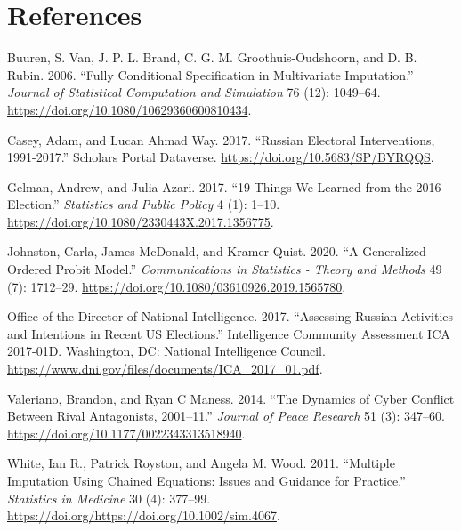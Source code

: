 \documentclass[
]{article}
\begin{document}
\hypertarget{references}{%
\section*{References}\label{references}}

\hypertarget{refs}{}
\leavevmode\hypertarget{ref-buuren_fullyconditionalspecification_2006}{}%
Buuren, S. Van, J. P. L. Brand, C. G. M. Groothuis-Oudshoorn, and D. B. Rubin. 2006. ``Fully Conditional Specification in Multivariate Imputation.'' \emph{Journal of Statistical Computation and Simulation} 76 (12): 1049--64. \url{https://doi.org/10.1080/10629360600810434}.

\leavevmode\hypertarget{ref-casey_russianelectoralinterventions_2017}{}%
Casey, Adam, and Lucan Ahmad Way. 2017. ``Russian Electoral Interventions, 1991-2017.'' Scholars Portal Dataverse. \url{https://doi.org/10.5683/SP/BYRQQS}.

\leavevmode\hypertarget{ref-gelman_19thingswe_2017}{}%
Gelman, Andrew, and Julia Azari. 2017. ``19 Things We Learned from the 2016 Election.'' \emph{Statistics and Public Policy} 4 (1): 1--10. \url{https://doi.org/10.1080/2330443X.2017.1356775}.

\leavevmode\hypertarget{ref-johnston_generalizedorderedprobit_2020}{}%
Johnston, Carla, James McDonald, and Kramer Quist. 2020. ``A Generalized Ordered Probit Model.'' \emph{Communications in Statistics - Theory and Methods} 49 (7): 1712--29. \url{https://doi.org/10.1080/03610926.2019.1565780}.

\leavevmode\hypertarget{ref-officeofthedirectorofnationalintelligence_assessingrussianactivities_2017}{}%
Office of the Director of National Intelligence. 2017. ``Assessing Russian Activities and Intentions in Recent US Elections.'' Intelligence Community Assessment ICA 2017-01D. Washington, DC: National Intelligence Council. \url{https://www.dni.gov/files/documents/ICA_2017_01.pdf}.

\leavevmode\hypertarget{ref-valeriano_dynamicscyberconflict_2014}{}%
Valeriano, Brandon, and Ryan C Maness. 2014. ``The Dynamics of Cyber Conflict Between Rival Antagonists, 2001--11.'' \emph{Journal of Peace Research} 51 (3): 347--60. \url{https://doi.org/10.1177/0022343313518940}.

\leavevmode\hypertarget{ref-white_multipleimputationusing_2011}{}%
White, Ian R., Patrick Royston, and Angela M. Wood. 2011. ``Multiple Imputation Using Chained Equations: Issues and Guidance for Practice.'' \emph{Statistics in Medicine} 30 (4): 377--99. \url{https://doi.org/https://doi.org/10.1002/sim.4067}.
\end{document}
